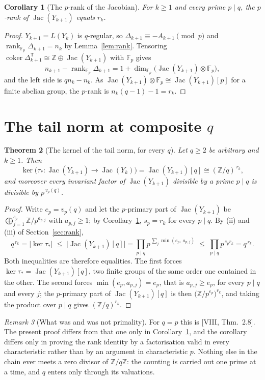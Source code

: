 \documentclass[11pt]{amsart}
\numberwithin{equation}{section}
\newtheorem{theorem}{Theorem}[section]
\newtheorem{corollary}[theorem]{Corollary}
\theoremstyle{definition}
\theoremstyle{remark}
\newtheorem{remark}[theorem]{Remark}
\newcommand{\Z}{\mathbb{Z}}
\newcommand{\F}{\mathbb{F}}
\newcommand{\Jac}{\operatorname{Jac}}
\newcommand{\coker}{\operatorname{coker}}
\newcommand{\rank}{\operatorname{rank}}
\newcommand{\ta}{\tau_*}
\begin{document}
\begin{corollary}[The $p$-rank of the Jacobian]\label{cor:prank}
For $k\ge1$ and every prime $p\mid q$, the $p$-rank of $\Jac(Y_{k+1})$ equals $r_k$.
\end{corollary}

\begin{proof}
$Y_{k+1}=L(Y_k)$ is $q$-regular, so $\Delta_{k+1}\equiv-A_{k+1}\pmod p$ and
$\rank_{\F_p}\Delta_{k+1}=n_k$ by Lemma~\ref{lem:rank}. Tensoring
$\coker\Delta_{k+1}^{\mathsf T}\cong\Z\oplus\Jac(Y_{k+1})$ with $\F_p$ gives
\[
n_{k+1}-\rank_{\F_p}\Delta_{k+1}=1+\dim_{\F_p}\bigl(\Jac(Y_{k+1})\otimes\F_p\bigr),
\]
and the left side is $qn_k-n_k$. As $\Jac(Y_{k+1})\otimes\F_p\cong\Jac(Y_{k+1})[p]$ for a
finite abelian group, the $p$-rank is $n_k(q-1)-1=r_k$.
\end{proof}

\section{The tail norm at composite \texorpdfstring{$q$}{q}}\label{sec:kernel}

\begin{theorem}[The kernel of the tail norm, for every $q$]\label{thm:main}
Let $q\ge2$ be arbitrary and $k\ge1$. Then
\[
\ker\bigl(\ta\colon\Jac(Y_{k+1})\to\Jac(Y_k)\bigr)=\Jac(Y_{k+1})[q]\cong(\Z/q)^{\,r_k},
\]
and moreover every invariant factor of $\Jac(Y_{k+1})$ divisible by a prime $p\mid q$ is
divisible by $p^{\,v_p(q)}$.
\end{theorem}

\begin{proof}
Write $e_p=v_p(q)$ and let the $p$-primary part of $\Jac(Y_{k+1})$ be
$\bigoplus_{j=1}^{s_p}\Z/p^{a_{p,j}}$ with $a_{p,j}\ge1$; by
Corollary~\ref{cor:prank}, $s_p=r_k$ for every $p\mid q$. By (ii) and (iii) of
Section~\ref{sec:rank},
\[
q^{\,r_k}=|\ker\ta|\;\le\;\bigl|\Jac(Y_{k+1})[q]\bigr|
=\prod_{p\mid q}p^{\,\sum_{j}\min(e_p,\,a_{p,j})}
\;\le\;\prod_{p\mid q}p^{\,e_p r_k}=q^{\,r_k}.
\]
Both inequalities are therefore equalities. The first forces
$\ker\ta=\Jac(Y_{k+1})[q]$, two finite groups of the same order one contained in the
other. The second forces $\min(e_p,a_{p,j})=e_p$, that is $a_{p,j}\ge e_p$, for every
$p\mid q$ and every $j$; the $p$-primary part of $\Jac(Y_{k+1})[q]$ is then
$\bigl(\Z/p^{e_p}\bigr)^{r_k}$, and taking the product over $p\mid q$ gives
$(\Z/q)^{r_k}$.
\end{proof}

\begin{remark}[What was and was not primality]\label{rem:whatwas}
For $q=p$ this is [VIII, Thm.~2.8]. The present proof differs from that one only in
Corollary~\ref{cor:prank}, and the corollary differs only in proving the rank identity by
a factorisation valid in every characteristic rather than by an argument in
characteristic $p$. Nothing else in the chain ever meets a zero divisor of $\Z/q\Z$: the
counting is carried out one prime at a time, and $q$ enters only through its valuations.
\end{remark}
\end{document}
